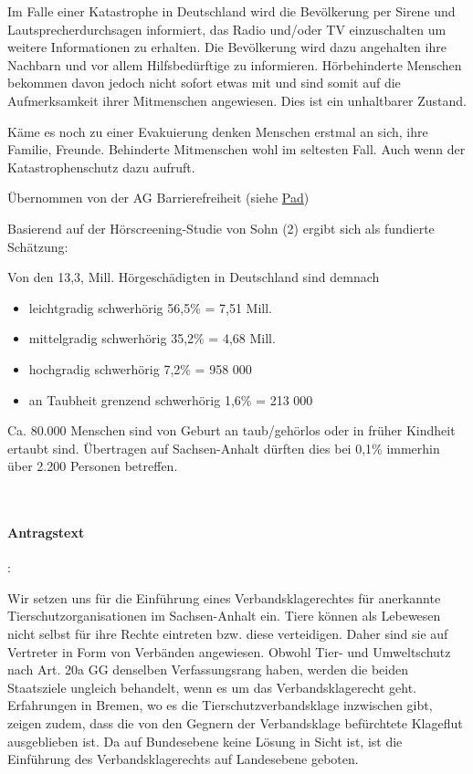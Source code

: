 {Im Falle einer Katastrophe in Deutschland wird die Bevölkerung per Sirene und Lautsprecherdurchsagen informiert, das Radio und/oder TV einzuschalten um weitere Informationen zu erhalten. Die Bevölkerung wird dazu angehalten ihre Nachbarn und vor allem Hilfsbedürftige zu informieren. Hörbehinderte Menschen bekommen davon jedoch nicht sofort etwas mit und sind somit auf die Aufmerksamkeit ihrer Mitmenschen angewiesen. Dies ist ein unhaltbarer Zustand.

Käme es noch zu einer Evakuierung denken Menschen erstmal an sich, ihre Familie, Freunde. Behinderte Mitmenschen wohl im seltesten Fall. Auch wenn der Katastrophenschutz dazu aufruft.

Übernommen von der AG Barrierefreiheit (siehe \href{https://ag_barrierefreiheit.piratenpad.de/4}{Pad})

Basierend auf der Hörscreening-Studie von Sohn (2) ergibt sich als fundierte Schätzung:

Von den 13,3, Mill. Hörgeschädigten in Deutschland sind demnach

\begin{itemize}
\item leichtgradig schwerhörig 56,5\% = 7,51 Mill.
\item mittelgradig schwerhörig 35,2\% = 4,68 Mill.
\item hochgradig schwerhörig 7,2\% = 958 000
\item an Taubheit grenzend schwerhörig 1,6\% = 213 000
\end{itemize}

Ca. 80.000 Menschen sind von Geburt an taub/gehörlos oder in früher Kindheit ertaubt sind. Übertragen auf Sachsen-Anhalt dürften dies bei 0,1\% immerhin über 2.200 Personen betreffen.
}


\\

\paragraph{Antragstext}:

Wir setzen uns für die Einführung eines Verbandsklagerechtes für anerkannte Tierschutzorganisationen im Sachsen-Anhalt ein. Tiere können als Lebewesen nicht selbst für ihre Rechte eintreten bzw. diese verteidigen. Daher sind sie auf Vertreter in Form von Verbänden angewiesen. Obwohl Tier- und Umweltschutz nach Art. 20a GG denselben Verfassungsrang haben, werden die beiden Staatsziele ungleich behandelt, wenn es um das Verbandsklagerecht geht. Erfahrungen in Bremen, wo es die Tierschutzverbandsklage inzwischen gibt, zeigen zudem, dass die von den Gegnern der Verbandsklage befürchtete Klageflut ausgeblieben ist. Da auf Bundesebene keine Lösung in Sicht ist, ist die Einführung des Verbandsklagerechts auf Landesebene geboten.

